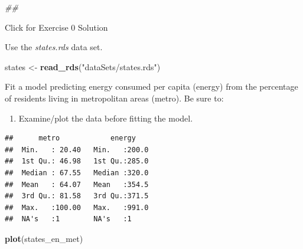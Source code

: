 \documentclass[]{book}
\newenvironment{Shaded}{\begin{snugshade}}{\end{snugshade}}
\newcommand{\CommentTok}[1]{\textcolor[rgb]{0.56,0.35,0.01}{\textit{#1}}}
\newcommand{\KeywordTok}[1]{\textcolor[rgb]{0.13,0.29,0.53}{\textbf{#1}}}
\newcommand{\NormalTok}[1]{#1}
\newcommand{\OperatorTok}[1]{\textcolor[rgb]{0.81,0.36,0.00}{\textbf{#1}}}
\newcommand{\StringTok}[1]{\textcolor[rgb]{0.31,0.60,0.02}{#1}}
\providecommand{\tightlist}{%
  \setlength{\itemsep}{0pt}\setlength{\parskip}{0pt}}
\begin{document}
\begin{Shaded}
\begin{Highlighting}[]
\CommentTok{## }
\end{Highlighting}
\end{Shaded}

{Click for Exercise 0 Solution}

Use the \emph{states.rds} data set.

\begin{Shaded}
\begin{Highlighting}[]
\NormalTok{  states <-}\StringTok{ }\KeywordTok{read_rds}\NormalTok{(}\StringTok{"dataSets/states.rds"}\NormalTok{)}
\end{Highlighting}
\end{Shaded}

Fit a model predicting energy consumed per capita (energy) from the percentage of residents living in metropolitan areas (metro). Be sure to:

\begin{enumerate}
\def\labelenumi{\arabic{enumi}.}
\tightlist
\item
  Examine/plot the data before fitting the model.
\end{enumerate}

\begin{Shaded}
\end{Shaded}

\begin{verbatim}
##      metro            energy     
##  Min.   : 20.40   Min.   :200.0  
##  1st Qu.: 46.98   1st Qu.:285.0  
##  Median : 67.55   Median :320.0  
##  Mean   : 64.07   Mean   :354.5  
##  3rd Qu.: 81.58   3rd Qu.:371.5  
##  Max.   :100.00   Max.   :991.0  
##  NA's   :1        NA's   :1
\end{verbatim}

\begin{Shaded}
\begin{Highlighting}[]
  \KeywordTok{plot}\NormalTok{(states_en_met)}
\end{Highlighting}
\end{Shaded}
\end{document}
